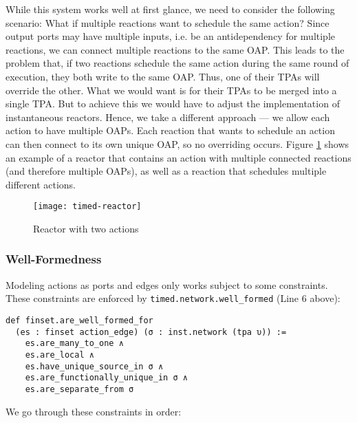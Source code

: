 While this system works well at first glance, we need to consider the following scenario:
What if multiple reactions want to schedule the same action?
Since output ports may have multiple inputs, i.e. be an antidependency for multiple reactions, we can connect multiple reactions to the same OAP.
This leads to the problem that, if two reactions schedule the same action during the same round of execution, they both write to the same OAP.
Thus, one of their TPAs will override the other.
What we would want is for their TPAs to be merged into a single TPA.
But to achieve this we would have to adjust the implementation of instantaneous reactors.
Hence, we take a different approach --- we allow each action to have multiple OAPs.
Each reaction that wants to schedule an action can then connect to its own unique OAP, so no overriding occurs.
Figure \ref{fig:timed-reactor} shows an example of a reactor that contains an action with multiple connected reactions (and therefore multiple OAPs), as well as a reaction that schedules multiple different actions.

\begin{figure}[h]
\centering
\texttt{[image: timed-reactor]}
\caption{Reactor with two actions}
\label{fig:timed-reactor}
\end{figure}
  
\subsubsection{Well-Formedness}
 
Modeling actions as ports and edges only works subject to some constraints.
These constraints are enforced by \lstinline{timed.network.well_formed} (Line 6 above):

\begin{lstlisting}
def finset.are_well_formed_for 
  (es : finset action_edge) (σ : inst.network (tpa υ)) :=
    es.are_many_to_one ∧ 
    es.are_local ∧
    es.have_unique_source_in σ ∧ 
    es.are_functionally_unique_in σ ∧
    es.are_separate_from σ
\end{lstlisting}

\noindent We go through these constraints in order:

